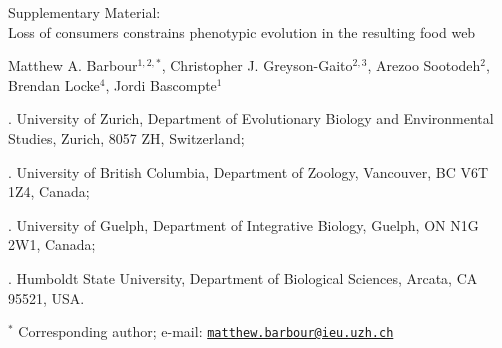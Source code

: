 \documentclass[11pt,]{article}
\title{}
\author{}
\date{}
\begin{document}
\vspace*{0.1cm}

\begin{center} \LARGE Supplementary Material: \\
Loss of consumers constrains phenotypic evolution in the resulting food web \end{center}

\bigskip

\begin{center} \large Matthew A. Barbour$^{1,2,\ast}$, Christopher J. Greyson-Gaito$^{2,3}$, Arezoo Sootodeh$^{2}$, Brendan Locke$^{4}$, Jordi Bascompte$^{1}$ \normalsize \end{center}

\bigskip

. University of Zurich, Department of Evolutionary Biology
and Environmental Studies, Zurich, 8057 ZH, Switzerland;

. University of British Columbia, Department of Zoology,
Vancouver, BC V6T 1Z4, Canada;

. University of Guelph, Department of Integrative Biology,
Guelph, ON N1G 2W1, Canada;

. Humboldt State University, Department of Biological
Sciences, Arcata, CA 95521, USA.

\(^\ast\) Corresponding author; e-mail:
\href{mailto:matthew.barbour@ieu.uzh.ch}{\nolinkurl{matthew.barbour@ieu.uzh.ch}}

\linenumbers{} \modulolinenumbers[3]

\newcommand{\beginsupplement}{%
        \setcounter{table}{0}
        \renewcommand{\thetable}{S\arabic{table}}%
        \setcounter{figure}{0}
        \renewcommand{\thefigure}{S\arabic{figure}}%
     }

\newpage

\beginsupplement 
\end{document}
